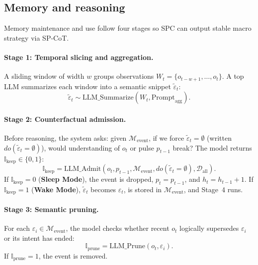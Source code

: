\documentclass[11pt,a4paper]{article}
\begin{document}
\subsection{Memory and reasoning}
\label{sec:memory}

Memory maintenance and use follow four stages so SPC can output stable macro strategy via SP-CoT.

\paragraph{Stage 1: Temporal slicing and aggregation.}
A sliding window of width $w$ groups observations $W_t = \{o_{t-w+1}, \ldots, o_t\}$. A top LLM summarizes each window into a semantic snippet $\tilde{\varepsilon}_t$:
\begin{equation}
\tilde{\varepsilon}_t \sim \text{LLM\_Summarize}(W_t, \text{Prompt}_{\text{agg}}).
\end{equation}

\paragraph{Stage 2: Counterfactual admission.}
Before reasoning, the system asks: given $\mathcal{M}_{\text{event}}$, if we force $\tilde{\varepsilon}_t = \emptyset$ (written $do(\tilde{\varepsilon}_t = \emptyset)$), would understanding of $o_t$ or pulse $p_{t-1}$ break? The model returns $\mathbb{I}_{\text{keep}} \in \{0,1\}$:
\begin{equation}
\mathbb{I}_{\text{keep}} = \text{LLM\_Admit}\left( o_t, p_{t-1}, \mathcal{M}_{\text{event}}, do(\tilde{\varepsilon}_t = \emptyset), \mathcal{D}_{\text{all}} \right).
\end{equation}
If $\mathbb{I}_{\text{keep}}=0$ (\textbf{Sleep Mode}), the event is dropped, $p_t = p_{t-1}$, and $h_t = h_{t-1}+1$. If $\mathbb{I}_{\text{keep}}=1$ (\textbf{Wake Mode}), $\tilde{\varepsilon}_t$ becomes $\varepsilon_t$, is stored in $\mathcal{M}_{\text{event}}$, and Stage~4 runs.

\paragraph{Stage 3: Semantic pruning.}
For each $\varepsilon_i \in \mathcal{M}_{\text{event}}$, the model checks whether recent $o_t$ logically supersedes $\varepsilon_i$ or its intent has ended:
\begin{equation}
\mathbb{I}_{\text{prune}} = \text{LLM\_Prune}\left( o_t, \varepsilon_i \right).
\end{equation}
If $\mathbb{I}_{\text{prune}}=1$, the event is removed.
\end{document}
